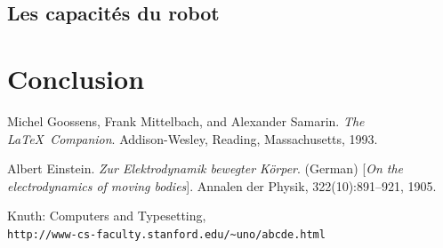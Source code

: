\documentclass[a4paper, 12pt]{report}
\begin{document}
\section{Les capacités du robot}

\chapter{Conclusion}
\lipsum[9-10]

\begin{thebibliography}{9}
Michel Goossens, Frank Mittelbach, and Alexander Samarin. 
\textit{The \LaTeX\ Companion}. 
Addison-Wesley, Reading, Massachusetts, 1993.

Albert Einstein. 
\textit{Zur Elektrodynamik bewegter K{\"o}rper}. (German) 
[\textit{On the electrodynamics of moving bodies}]. 
Annalen der Physik, 322(10):891–921, 1905.

Knuth: Computers and Typesetting,
\\\texttt{http://www-cs-faculty.stanford.edu/\~{}uno/abcde.html}
\end{thebibliography}
\end{document}

